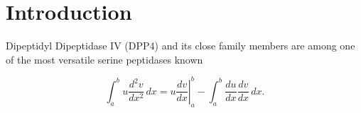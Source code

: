 \section{Introduction}
\label{intro} 

Dipeptidyl Dipeptidase IV (DPP4) and its close family members are among one of the most versatile serine peptidases known

\begin{equation}
\label{eqn:drag}
	\int_a^bu\frac{d^2v}{dx^2}\,dx
	=\left.u\frac{dv}{dx}\right|_a^b
	-\int_a^b\frac{du}{dx}\frac{dv}{dx}\,dx.
\end{equation}

